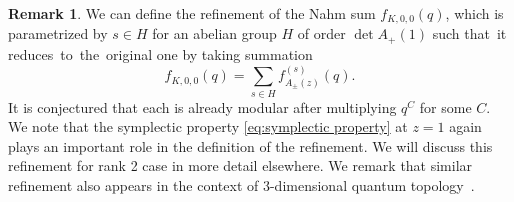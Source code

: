 \documentclass[10pt,a4paper]{amsart}
\numberwithin{equation}{section}
\theoremstyle{definition}
\newtheorem{Remark}[Theorem]{Remark}
\begin{document}
\begin{Remark}
 We can define the refinement  of the Nahm sum $f_{K,0,0} (q)$,
 which is parametrized by $s \in H$ for an abelian group $H$ of order $\det A_+ (1)$
 such that~it reduces~to~the~original one by taking summation \cite[Definition 5.12]{mizuno2020difference}
 \begin{equation*}
 f_{K,0,0} (q) = \sum_{s \in H} f_{A_\pm (z)}^{(s)} (q).
 \end{equation*}
 It is conjectured that each  is already
 modular after multiplying $q^C$ for some $C$.
 We note that the symplectic property \eqref{eq:symplectic property}
 at $z=1$ again plays an important role in the definition of the refinement.
 We will discuss this refinement for rank 2 case in more detail elsewhere.
 We remark that similar refinement also appears in the context of
 $3$-dimensional quantum topology~\cite[Section 6.3]{garoufalidis2021knots}.
\end{Remark}
\end{document}
